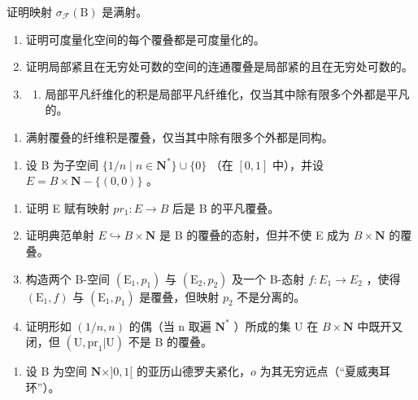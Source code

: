 证明映射 \(\sigma_{\mathcal{F}}(\mathrm{B})\) 是满射。

\exercisegroup

\begin{enumerate}
\def\labelenumi{\arabic{enumi})}
\item
  证明可度量化空间的每个覆叠都是可度量化的。
\item
  证明局部紧且在无穷处可数的空间的连通覆叠是局部紧的且在无穷处可数的。
\item
  \begin{enumerate}
  \def\labelenumii{\alph{enumii})}
  \tightlist
  \item
    局部平凡纤维化的积是局部平凡纤维化，仅当其中除有限多个外都是平凡的。
  \end{enumerate}
\end{enumerate}

\begin{enumerate}
\def\labelenumi{\alph{enumi})}
\setcounter{enumi}{1}
\tightlist
\item
  满射覆叠的纤维积是覆叠，仅当其中除有限多个外都是同构。
\end{enumerate}

\begin{enumerate}
\def\labelenumi{\arabic{enumi})}
\setcounter{enumi}{3}
\tightlist
\item
  设 B 为子空间 \(\{1/n \mid n \in \mathbf{N}^*\} \cup \{0\}\) （在 \([0,1]\) 中），并设 \(E = B \times \mathbf{N} - \{(0,0)\}\) 。
\end{enumerate}

\begin{enumerate}
\def\labelenumi{\alph{enumi})}
\item
  证明 E 赋有映射 \(pr_{1}: E \to B\) 后是 B 的平凡覆叠。
\item
  证明典范单射 \(E \hookrightarrow B \times \mathbf{N}\) 是 B 的覆叠的态射，但并不使 E 成为 \(B \times \mathbf{N}\) 的覆叠。
\item
  构造两个 B-空间 \((\mathrm{E}_{1}, p_{1})\) 与 \((\mathrm{E}_{2}, p_{2})\) 及一个 B-态射 \(f: E_{1} \to E_{2}\) ，使得 \((\mathrm{E}_{1}, f)\) 与 \((\mathrm{E}_{1}, p_{1})\) 是覆叠，但映射 \(p_{2}\) 不是分离的。
\item
  证明形如 \((1/n,n)\) 的偶（当 n 取遍 \(\mathbf{N}^{*}\) ）所成的集 U 在 \(B \times \mathbf{N}\) 中既开又闭，但 \((\mathrm{U},\mathrm{pr}_{1}|\mathrm{U})\) 不是 B 的覆叠。
\end{enumerate}

\begin{enumerate}
\def\labelenumi{\arabic{enumi})}
\setcounter{enumi}{4}
\tightlist
\item
  设 B 为空间 \(\mathbf{N} \times ]0,1[\) 的亚历山德罗夫紧化，\(o\) 为其无穷远点（“夏威夷耳环”）。
\end{enumerate}


